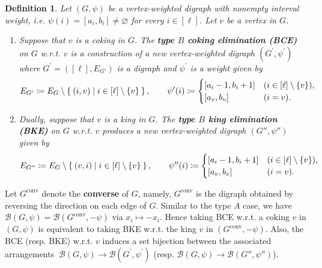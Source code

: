 \documentclass[11pt]{article}
\newtheorem{definition}[theo]{Definition}
\theoremstyle{definition}
\numberwithin{equation}{section}
\begin{document}
\begin{definition}
\label{def:BCE-BKE}
Let $(G,\psi)$ be a vertex-weighted digraph with nonempty interval weight,  i.e. $ \psi(i) = [a_{i}, b_{i}]\ne \varnothing$ for every $ i \in [\ell] $. Let  $v$ be a vertex in $G$.
\begin{enumerate}[(1)]
\item Suppose that $v$ is a coking in $ G $. 
The \textbf{type $B$ coking elimination (BCE)} on $G$ w.r.t. $v$ is a construction of a new vertex-weighted digraph $ (G^{\prime}, \psi^{\prime}) $ where $ G^{\prime}  =( [\ell] , E_{G'})$ is a digraph   and $ \psi^{\prime} $ is a weight given by
\begin{align*}
E_{G^{\prime}}  \coloneqq E_{G}\setminus\Set{(i,v) | i \in [\ell]\setminus\{v\}}, \qquad
\psi^{\prime}(i)  \coloneqq \begin{cases}
[a_{i}-1, b_{i}+1] & (i \in [\ell]\setminus\{v\}), \\
[a_{v}, b_{v}] & (i=v). 
\end{cases}
\end{align*}
\item Dually, suppose that  $v$ is a king in $ G $. 
The \textbf{type $B$ king elimination (BKE)} on $G$ w.r.t. $v$  produces a new vertex-weighted digraph $ (G'', \psi'') $ given by
\begin{align*}
E_{G''}  \coloneqq E_{G}\setminus\Set{(v,i) | i \in [\ell]\setminus\{v\}}, \qquad
\psi''(i)  \coloneqq \begin{cases}
[a_{i}-1, b_{i}+1] & (i \in [\ell]\setminus\{v\}), \\
[a_{v}, b_{v}] & (i=v). 
\end{cases}
\end{align*}
\end{enumerate}
\end{definition}
Let  $ G^{\mathrm{conv}} $ denote the \textbf{converse} of $G$, namely, $ G^{\mathrm{conv}} $ is the digraph obtained by reversing the direction on each edge of $ G $. 
Similar to the type $A$ case, we have $ \mathcal{B}(G,\psi) =  \mathcal{B}(G^{\mathrm{conv}}, -\psi) $ via $ x_{i} \mapsto -x_i $.
Hence taking BCE w.r.t. a coking $v$ in $(G,\psi)$ is equivalent to  taking BKE w.r.t. the king $v$ in $(G^{\mathrm{conv}}, -\psi)$.
Also, the BCE (resp. BKE) w.r.t. $v$ induces a set bijection between the associated arrangements $\ \mathcal{B}(G,\psi) \longrightarrow  \mathcal{B}(G^{\prime}, \psi^{\prime}) $ (resp. $  \mathcal{B}(G,\psi) \longrightarrow  \mathcal{B}(G'', \psi'') $).
\end{document}
